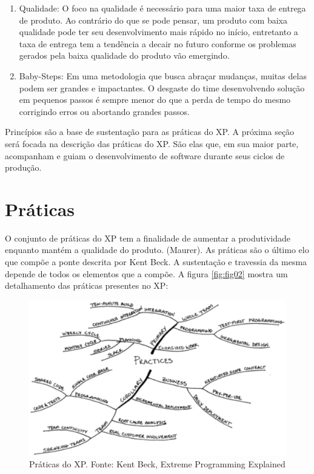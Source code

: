 \begin{enumerate}
 	\item Qualidade: O foco na qualidade é necessário para uma maior taxa de entrega de produto. Ao contrário do que se pode pensar, um produto com baixa qualidade pode ter seu desenvolvimento mais rápido no início, entretanto a taxa de entrega tem a tendência a decair no futuro conforme os problemas gerados pela baixa qualidade do produto vão emergindo.

	\item Baby-Steps: Em uma metodologia que busca abraçar mudanças, muitas delas podem ser grandes e impactantes. O desgaste do time desenvolvendo solução em pequenos passos é sempre menor do que a perda de tempo do mesmo corrigindo erros ou abortando grandes passos.

\end{enumerate}

Princípios são a base de sustentação para as práticas do XP. A próxima seção será focada na descrição das práticas do XP. São elas que, em sua maior parte, acompanham e guiam o desenvolvimento de software durante seus ciclos de produção.

\section{Práticas}

O conjunto de práticas do XP tem a finalidade de aumentar a produtividade enquanto mantém a qualidade do produto. (Maurer). As práticas são o último elo que compõe a ponte descrita por Kent Beck. A sustentação e travessia da mesma depende de todos os elementos que a compõe. A figura \ref{fig:fig02} mostra um detalhamento das práticas presentes no XP:

\begin{figure}[ht]
	\centering
	\label{fig02}
		\includegraphics[keepaspectratio=true,scale=0.5]{figuras/fig02.eps}
	\caption{Práticas do XP. Fonte: Kent Beck, Extreme Programming Explained}
\end{figure}

